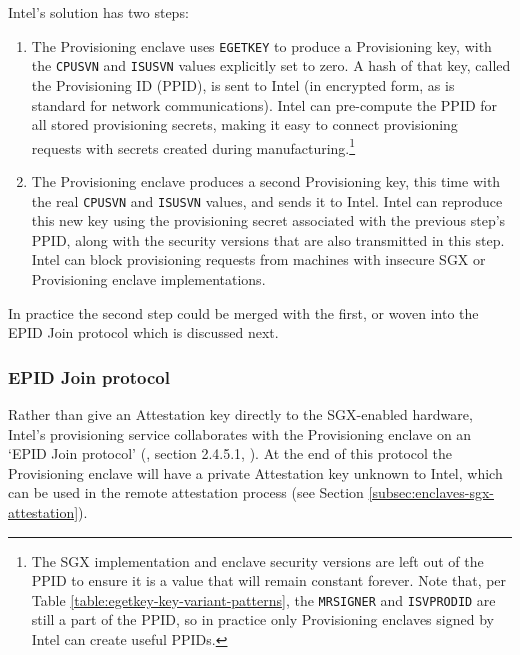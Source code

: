 Intel's solution has two steps:
\begin{enumerate}
    \item The Provisioning enclave uses {\tt EGETKEY} to produce a Provisioning key, with the {\tt CPUSVN} and {\tt ISUSVN} values explicitly set to zero. A hash of that key, called the Provisioning ID (PPID), is sent to Intel (in encrypted form, as is standard for network communications). Intel can pre-compute the PPID for all stored provisioning secrets, making it easy to connect provisioning requests with secrets created during manufacturing.\footnote{The SGX implementation and enclave security versions are left out of the PPID to ensure it is a value that will remain constant forever. Note that, per Table \ref{table:egetkey-key-variant-patterns}, the {\tt MRSIGNER} and {\tt ISVPRODID} are still a part of the PPID, so in practice only Provisioning enclaves signed by Intel can create useful PPIDs.}
    \item The Provisioning enclave produces a second Provisioning key, this time with the real {\tt CPUSVN} and {\tt ISUSVN} values, and sends it to Intel. Intel can reproduce this new key using the provisioning secret associated with the previous step's PPID, along with the security versions that are also transmitted in this step. Intel can block provisioning requests from machines with insecure SGX or Provisioning enclave implementations.
\end{enumerate}

In practice \cite{sgx-remote-attestation-is-not-sufficient} the second step could be merged with the first, or woven into the EPID Join protocol which is discussed next.

\subsubsection{EPID Join protocol}

Rather than give an Attestation key directly to the SGX-enabled hardware, Intel's provisioning service collaborates with the Provisioning enclave on an `EPID Join protocol' (\cite{epid-paper}, \cite{sgx-extending-sgx-autonomy-and-anonymity-thesis} section 2.4.5.1, \cite{sgx-remote-attestation-is-not-sufficient}). At the end of this protocol the Provisioning enclave will have a private Attestation key unknown to Intel, which can be used in the remote attestation process (see Section \ref{subsec:enclaves-sgx-attestation}).

